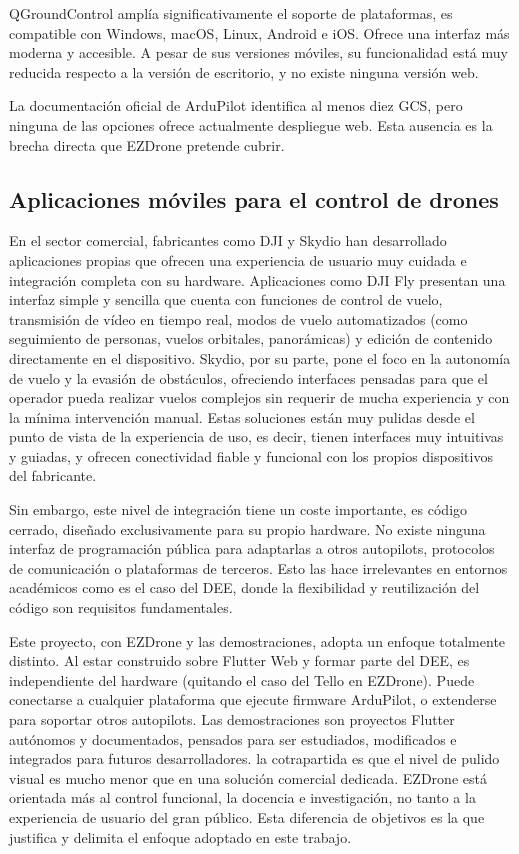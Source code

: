 QGroundControl amplía significativamente el soporte de plataformas, es compatible con Windows, macOS, Linux, Android e iOS. Ofrece una interfaz más moderna y accesible. A pesar de sus versiones móviles, su funcionalidad está muy reducida respecto a la versión de escritorio, y no existe ninguna versión web.

La documentación oficial de ArduPilot identifica al menos diez GCS, pero ninguna de las opciones ofrece actualmente despliegue web\cite{ardupilot_gcs}. Esta ausencia es la brecha directa que EZDrone pretende cubrir.   


\subsection{Aplicaciones móviles para el control de drones}
En el sector comercial, fabricantes como DJI y Skydio han desarrollado aplicaciones propias que ofrecen una experiencia de usuario muy cuidada e integración completa con su hardware. Aplicaciones como DJI Fly\cite{djifly} presentan una interfaz simple y sencilla que cuenta con funciones de control de vuelo, transmisión de vídeo en tiempo real, modos de vuelo automatizados (como seguimiento de personas, vuelos orbitales, panorámicas) y edición de contenido directamente en el dispositivo. Skydio\cite{skydio}, por su parte, pone el foco en la autonomía de vuelo y la evasión de obstáculos, ofreciendo interfaces pensadas para que el operador pueda realizar vuelos complejos sin requerir de mucha experiencia y con la mínima intervención manual. Estas soluciones están muy pulidas desde el punto de vista de la experiencia de uso, es decir, tienen interfaces muy intuitivas y guiadas, y ofrecen conectividad fiable y funcional con los propios dispositivos del fabricante.

Sin embargo, este nivel de integración tiene un coste importante, es código cerrado, diseñado exclusivamente para su propio hardware. No existe ninguna interfaz de programación pública para adaptarlas a otros autopilots, protocolos de comunicación o plataformas de terceros. Esto las hace irrelevantes en entornos académicos como es el caso del DEE, donde la flexibilidad y reutilización del código son requisitos fundamentales.

Este proyecto, con EZDrone y las demostraciones, adopta un enfoque totalmente distinto. Al estar construido sobre Flutter Web y formar parte del DEE, es independiente del hardware (quitando el caso del Tello en EZDrone). Puede conectarse a cualquier plataforma que ejecute firmware ArduPilot, o extenderse para soportar otros autopilots. Las demostraciones son proyectos Flutter autónomos y documentados, pensados para ser estudiados, modificados e integrados para futuros desarrolladores. la cotrapartida es que el nivel de pulido visual es mucho menor que en una solución comercial dedicada. EZDrone está orientada más al control funcional, la docencia e investigación, no tanto a la experiencia de usuario del gran público. Esta diferencia de objetivos es la que justifica y delimita el enfoque adoptado en este trabajo.


